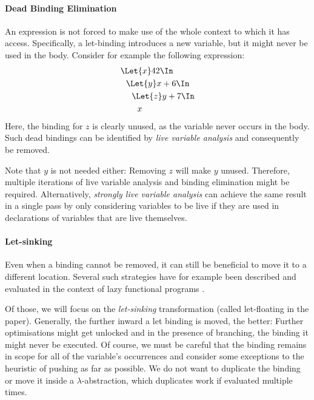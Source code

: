   \paragraph{Dead Binding Elimination}
    An expression is not forced to make use of the whole context to which it has access.
    Specifically, a let-binding introduces a new variable, but it might never be used
    in the body.
    Consider for example the following expression:
    \begin{align*}
      &\Let{x} 42 \In            \\
      &\ \ \Let{y} x + 6 \In     \\
      &\ \ \ \ \Let{z} y + 7 \In \\
      &\ \ \ \ \ \ x
    \end{align*}
    Here, the binding for $z$ is clearly unused, as the variable never occurs in the body.
    Such dead bindings can be identified by \emph{live variable analysis}
    and consequently be removed.

    Note that $y$ is not needed either: Removing $z$ will make $y$ unused.
    Therefore, multiple iterations of live variable analysis and binding elimination might be required.
    Alternatively, \emph{strongly live variable analysis} can achieve the same result in a single pass
    by only considering variables to be live
    if they are used in declarations of variables that are live themselves.
  \paragraph{Let-sinking}
    Even when a binding cannot be removed,
    it can still be beneficial to move it to a different location.
    Several such strategies have for example been described and evaluated
    in the context of lazy functional programs
    \cite{Jones1996LetFloating}.

    Of those, we will focus on the \emph{let-sinking} transformation
    (called let-floating in the paper).
    Generally, the further inward a let binding is moved, the better:
    Further optimisations might get unlocked and in the presence of branching,
    the binding it might never be executed.
    Of course, we must be careful that the binding remains in scope
    for all of the variable's occurrences
    and consider some exceptions to the heuristic of pushing as far as possible.
    We do not want to duplicate the binding
    or move it inside a $\lambda$-abstraction, which duplicates work
    if evaluated multiple times.

